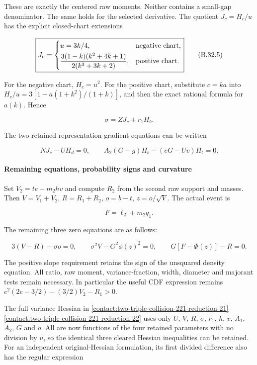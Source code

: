These are exactly the centered raw moments. Neither contains a small-gap
denominator. The same holds for the selected derivative. The quotient
$J_c=H_c/u$ has the explicit closed-chart extensions

\[
 \boxed{
 J_c=\begin{cases}
 u=3k/4,&\text{negative chart},\\[1mm]
 \displaystyle{3(1-k)(k^2+4k+1)\over2(k^3+3k+2)},
       &\text{positive chart}.
 \end{cases}}
\tag{B.32.5}\label{contact:two-triple-221-mass-elimination-5}
\]

For the negative chart, $H_c=u^2$. For the positive chart, substitute
$c=ka$ into $H_c/u=3[1-a(1+k^2)/(1+k)]$, and then the exact rational formula
for $a(k)$. Hence

\[
 \boxed{\sigma=ZJ_c+r_1H_b.}
\tag{B.32.6}\label{contact:two-triple-221-mass-elimination-6}
\]

The two retained representation-gradient equations can be written

\[
 \boxed{N J_c-UH_d=0,\qquad
 A_2(G-g)H_b-(eG-Uv)H_t=0.}
\tag{B.32.7}\label{contact:two-triple-221-mass-elimination-7}
\]

\paragraph{Remaining equations, probability signs and curvature}

Set $V_2=te-m_2hv$ and compute $R_2$ from the second raw support and masses.
Then $V=V_1+V_2$, $R=R_1+R_2$, $o=b-t$, $z=o/\sqrt{V}$. The actual event is

\[
 F=\ell_2+m_2q_1.
\]

The remaining three zero equations are as follows:

\[
 3(V-R)-\sigma o=0,\qquad
 \sigma^2V-G^2\phi(z)^2=0,\qquad
 G[F-\Phi(z)]-R=0.
\tag{B.32.8}\label{contact:two-triple-221-mass-elimination-8}
\]

The positive slope requirement retains the sign of the unsquared density
equation. All ratio, raw moment, variance-fraction, width, diameter and
majorant tests remain necessary. In particular the useful CDF expression remains
$e^2(2e-3/2)-(3/2)V_2-R_1>0$.

The full variance Hessian in
\eqref{contact:two-triple-collision-221-reduction-21}--\eqref{contact:two-triple-collision-221-reduction-22} uses
only $U$, $V$, $R$, $\sigma$, $r_1$, $h$, $v$, $A_1$, $A_2$, $G$ and $o$.
All are now functions of the four retained parameters with no division by
$u$, so the identical three cleared Hessian inequalities can be retained.
For an independent original-Hessian formulation, its first divided
difference also has the regular expression

